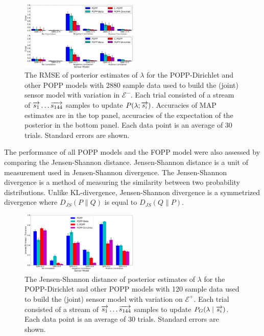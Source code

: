 \begin{figure}[t!]
	\centering
	\includegraphics[width=0.5\textwidth]{./figures/tjnr_comparison_2880.png}
    \caption{The RMSE of posterior estimates of $\lambda$ for the POPP-Dirichlet and other POPP models with 2880 sample data used to build the (joint) sensor model with variation in $\mathcal{E^-}$. Each trial consisted of a stream of $\protect\overrightarrow{s_1} \ldots \protect\overrightarrow{s_{144}}$ samples to update $P(\lambda ; \protect\overrightarrow{s_i})$. Accuracies of MAP estimates are in the top panel, accuracies of the expectation of the posterior in the bottom panel. Each data point is an average of 30 trials. Standard errors are shown.} 
	\label{fig:tjnr_comparison_2880}
\end{figure}

The performance of all POPP models and the FOPP model were also assessed by comparing the Jensen-Shannon distance. Jensen-Shannon distance is a unit of measurement used in Jensen-Shannon divergence. The Jensen-Shannon divergence is a method of measuring the similarity between two probability distributions. Unlike KL-divergence, Jensen-Shannon divergence is a symmetrized divergence where $D_{JS}(P \parallel Q)$ is equal to $D_{JS}(Q \parallel P)$.

\begin{figure}[t!]
	\centering
	\includegraphics[width=0.5\textwidth]{./figures/tjpr_comparison_120_kl.png}
	\caption{The Jensen-Shannon distance of posterior estimates of $\lambda$ for the POPP-Dirichlet and other POPP models with 120 sample data used to build the (joint) sensor model with variation on $\mathcal{E^+}$. Each trial consisted of a stream of $\protect\overrightarrow{s_1} \ldots \protect\overrightarrow{s_{144}}$ samples to update $P_G(\lambda \mid \protect\overrightarrow{s_i})$. Each data point is an average of 30 trials. Standard errors are shown.} 
	\label{fig:tjpr_comparison_120_kl}
\end{figure}

